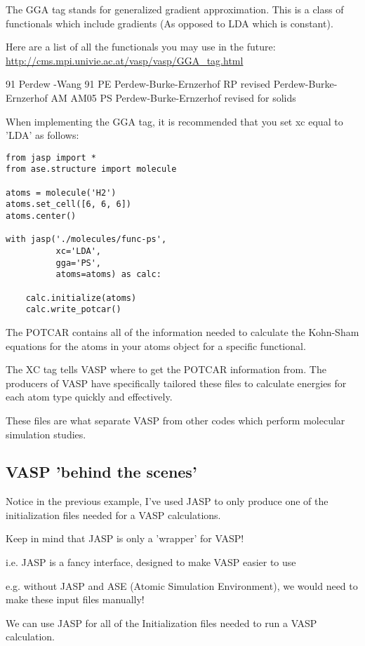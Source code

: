 \documentclass[11pt]{article}
\begin{document}
The GGA tag stands for generalized gradient approximation. This is a class of functionals which include gradients (As opposed to LDA which is constant).

Here are a list of all the functionals you may use in the future:
\url{http://cms.mpi.univie.ac.at/vasp/vasp/GGA_tag.html}

91        Perdew -Wang 91
PE        Perdew-Burke-Ernzerhof
RP        revised Perdew-Burke-Ernzerhof
AM        AM05
PS        Perdew-Burke-Ernzerhof revised for solids

When implementing the GGA tag, it is recommended that you set xc equal to 'LDA' as follows:

\begin{verbatim}
from jasp import *
from ase.structure import molecule

atoms = molecule('H2')
atoms.set_cell([6, 6, 6])
atoms.center()

with jasp('./molecules/func-ps',
          xc='LDA',
          gga='PS',
          atoms=atoms) as calc:

    calc.initialize(atoms)
    calc.write_potcar()
\end{verbatim}


The POTCAR contains all of the information needed to calculate the Kohn-Sham equations for the atoms in your atoms object for a specific functional.

The XC tag tells VASP where to get the POTCAR information from. The producers of VASP have specifically tailored these files to calculate energies for each atom type quickly and effectively.

These files are what separate VASP from other codes which perform molecular simulation studies.

\subsection{VASP 'behind the scenes'}
\label{sec-2-2}
Notice in the previous example, I've used JASP to only produce one of the initialization files needed for a VASP calculations.

Keep in mind that JASP is only a 'wrapper' for VASP!

i.e. JASP is a fancy interface, designed to make VASP easier to use

e.g. without JASP and ASE (Atomic Simulation Environment), we would need to make these input files manually!

We can use JASP for all of the Initialization files needed to run a VASP calculation.
\end{document}

